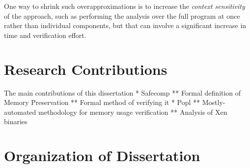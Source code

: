 One way to shrink such overapproximations is to increase the
\emph{context sensitivity}
of the approach, such as performing the analysis over the full program at once
rather than individual components, but that can involve
a significant increase in time and verification effort.



\section{Research Contributions}
The main contributions of this dissertation
* Safecomp
** Formal definition of Memory Preservation
** Formal method of verifying it
* Popl
** Mostly-automated methodology for memory usage verification
** Analysis of Xen binaries


\section{Organization of Dissertation}
